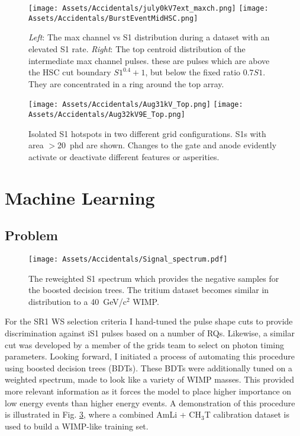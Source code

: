 \begin{figure}
    \centering
    \texttt{[image: Assets/Accidentals/july0kV7ext\_maxch.png]}
        \texttt{[image: Assets/Accidentals/BurstEventMidHSC.png]}
    \caption[Accidentals data isolated S1 distributions during a flare-up.]%
    {\textit{Left}: The max channel vs S1 distribution during a dataset with an elevated S1 rate.
    \textit{Right}: The top centroid distribution of the intermediate max channel pulses.
    these are pulses which are above the HSC cut boundary $S1^{0.4} +1$, but below the fixed ratio $0.7 S1$.
    They are concentrated in a ring around the top array.}
    \label{fig:maxchannel_burst}
\end{figure}

\begin{figure}
    \centering
    \texttt{[image: Assets/Accidentals/Aug31kV\_Top.png]}
      \texttt{[image: Assets/Accidentals/Aug32kV9E\_Top.png]}

    \caption[Isolated S1 hotspots in two different grid configurations. ]%
    {Isolated S1 hotspots in two different grid configurations. 
    S1s with area $>$20~phd are shown. 
    Changes to the gate and anode evidently activate or deactivate different features or asperities.}
    \label{fig:is1_hotspots}
\end{figure}
\afterpage{\FloatBarrier}
\section{Machine Learning}
\subsection{Problem}


\begin{figure}
    \centering
    \texttt{[image: Assets/Accidentals/Signal\_spectrum.pdf]}

    \caption[The reweighted S1 spectrum which provides the negative samples for the boosted decision trees.]%
    {The reweighted S1 spectrum which provides the negative samples for the boosted decision trees.
    The tritium dataset becomes similar in distribution to a 40~GeV/c$^2$ WIMP.}
    \label{fig:tritium_amli_spectrum}
\end{figure}


For the SR1 WS selection criteria I hand-tuned the pulse shape cuts to provide discrimination against iS1 pulses based on a number of RQs.
Likewise, a similar cut was developed by a member of the grids team to select on photon timing parameters.
Looking forward, I initiated a process of automating this procedure using boosted decision trees (BDTs).
These BDTs were additionally tuned on a weighted spectrum, made to look like a variety of WIMP masses.
This provided more relevant information as it forces the model to place higher importance on low energy events than higher energy events.
A demonstration of this procedure is illustrated in Fig. \ref{fig:tritium_amli_spectrum}, where a combined AmLi + CH$_3$T calibration dataset is used to build a WIMP-like training set.

